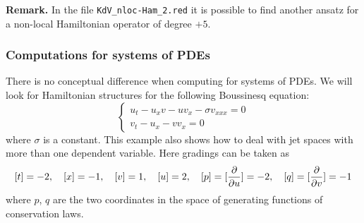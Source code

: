 \textbf{Remark.} In the file \texttt{KdV\_nloc-Ham\_2.red} it is possible to
find another ansatz for a non-local Hamiltonian operator of degree $+5$.

\subsubsection{Computations for systems of PDEs}
\label{sec:comp-syst-pdes}

There is no conceptual difference when computing for systems of PDEs. We will
look for Hamiltonian structures for the following Boussinesq equation:
\begin{equation}
  \label{cdiffeq:1}
  \left\{
  \begin{array}{l}
  u_t-u_xv-uv_x-\sigma v_{xxx}=0\\
  v_t-u_x-vv_x=0
\end{array}
\right.
\end{equation}
where $\sigma$ is a constant. This example also shows how to deal with jet
spaces with more than one dependent variable. Here gradings can be taken as
\[
  [t]=-2,\quad [x]=-1,\quad [v]=1,\quad [u]=2,\quad [p]=[\pd{}{u}]=-2,\quad
  [q]=[\pd{}{v}]=-1
\]
where $p$, $q$ are the two coordinates in the space of generating functions of
conservation laws.

